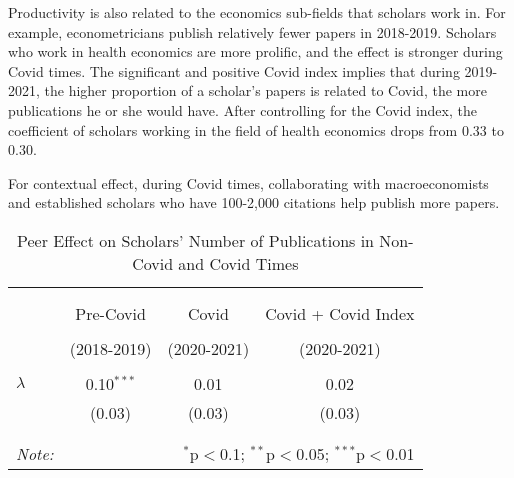 Productivity is also related to the economics sub-fields that scholars work in. For example, econometricians publish relatively fewer papers in 2018-2019. Scholars who work in health economics are more prolific, and the effect is stronger during Covid times. The significant and positive Covid index implies that during 2019-2021, the higher proportion of a scholar's papers is related to Covid, the more publications he or she would have. After controlling for the Covid index, the coefficient of scholars working in the field of health economics drops from $0.33$ to $0.30$.

For contextual effect, during Covid times, collaborating with macroeconomists and established scholars who have 100-2,000 citations help publish more papers.

\begin{table}[!htbp] \centering 
  \caption{Peer Effect on Scholars' Number of Publications in Non-Covid and Covid Times} 
\begin{tabular}{lccc} 
\\[-1.8ex]\hline \hline \\[-1.8ex] 
\\[-1.8ex] & \multicolumn{1}{c}{Pre-Covid} & \multicolumn{1}{c}{Covid} & \multicolumn{1}{c}{Covid + Covid Index} \\ 
\\[-1.8ex] & (2018-2019) & (2020-2021) & (2020-2021) \\ 
\hline \\[-1.8ex]
  $\lambda$ & 0.10$^{***}$ & 0.01 & 0.02 \\ 
  & (0.03) & (0.03) & (0.03) \\
 \hline \\[-1.8ex] 
\hline \\[-1.8ex] 
\textit{Note:}  & \multicolumn{3}{r}{$^{*}$p$<$0.1; $^{**}$p$<$0.05; $^{***}$p$<$0.01} \\ 
\end{tabular}
\end{table} 

